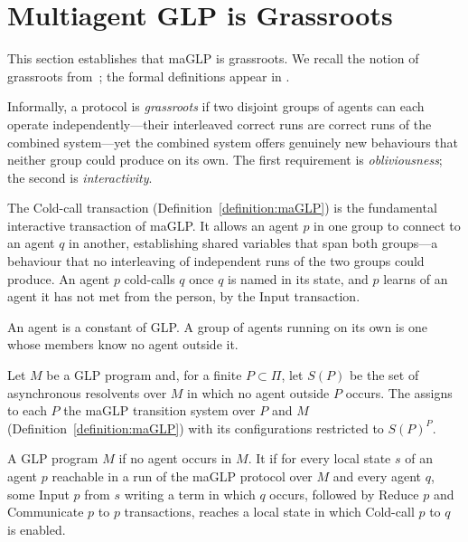 \section{Multiagent GLP is Grassroots}\label{sec:grassroots}

This section establishes that maGLP is grassroots. We recall the notion of grassroots from~\cite{lewis2026volitional}; the formal definitions appear in .

Informally, a protocol is \emph{grassroots} if two disjoint groups of agents can each operate independently---their interleaved correct runs are correct runs of the combined system---yet the combined system offers genuinely new behaviours that neither group could produce on its own. The first requirement is \emph{obliviousness}; the second is \emph{interactivity}.

The Cold-call transaction (Definition~\ref{definition:maGLP}) is the fundamental interactive transaction of maGLP. It allows an agent $p$ in one group to connect to an agent $q$ in another, establishing shared variables that span both groups---a behaviour that no interleaving of independent runs of the two groups could produce. An agent $p$ cold-calls $q$ once $q$ is named in its state, and $p$ learns of an agent it has not met from the person, by the Input transaction.

An agent is a constant of GLP. A group of agents running on its own is one whose members know no agent outside it.

\begin{definition}\label{definition:maglp-protocol}
Let $M$ be a GLP program and, for a finite $P \subset \Pi$, let $S(P)$ be the set of asynchronous resolvents over $M$ in which no agent outside $P$ occurs. The  assigns to each $P$ the maGLP transition system over $P$ and $M$ (Definition~\ref{definition:maGLP}) with its configurations restricted to $S(P)^P$.
\end{definition}

\begin{definition}\label{definition:uses-cold-calls}
A GLP program $M$  if no agent occurs in $M$. It  if for every local state $s$ of an agent $p$ reachable in a run of the maGLP protocol over $M$ and every agent $q$, some Input $p$ from $s$ writing a term in which $q$ occurs, followed by Reduce $p$ and Communicate $p$ to $p$ transactions, reaches a local state in which Cold-call $p$ to $q$ is enabled.
\end{definition}

